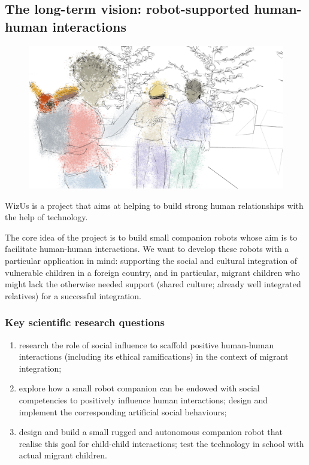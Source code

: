 \documentclass[11pt]{report}
\newcommand{\project}{WizUs\xspace}
\begin{document}
\subsection{The long-term vision: robot-supported human-human interactions}


\begin{figure}[!htbp]
    \centering
    \includegraphics[width=0.9\linewidth]{figs/render5-colors.png}
\end{figure}

\project is a project that aims at helping to build strong human
relationships with the help of technology.

The core idea of the project is to build small companion robots whose
aim is to facilitate human-human interactions. We want to develop these
robots with a particular application in mind: supporting the social and
cultural integration of vulnerable children in a foreign country, and in
particular, migrant children who might lack the otherwise needed support
(shared culture; already well integrated relatives) for a successful
integration.

\subsubsection{Key scientific research questions}

\begin{enumerate}
\item research the role of social influence to scaffold positive human-human
    interactions (including its ethical ramifications) in the context of migrant
    integration;
\item explore how a small robot companion can be endowed with social
    competencies to positively influence human interactions; design and
    implement the corresponding artificial social behaviours;
\item design and build a small rugged and autonomous companion robot that
    realise this goal for child-child interactions; test the technology in
    school with actual migrant children.
\end{enumerate}
\end{document}
